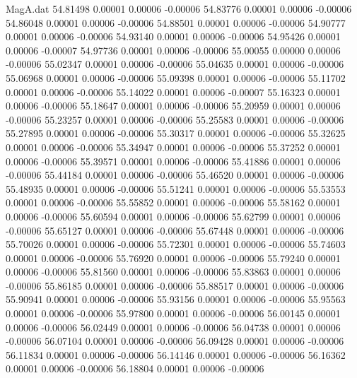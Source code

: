 \begin{filecontents}{MagA.dat}
  54.81498    0.00001    0.00006   -0.00006
  54.83776    0.00001    0.00006   -0.00006
  54.86048    0.00001    0.00006   -0.00006
  54.88501    0.00001    0.00006   -0.00006
  54.90777    0.00001    0.00006   -0.00006
  54.93140    0.00001    0.00006   -0.00006
  54.95426    0.00001    0.00006   -0.00007
  54.97736    0.00001    0.00006   -0.00006
  55.00055    0.00000    0.00006   -0.00006
  55.02347    0.00001    0.00006   -0.00006
  55.04635    0.00001    0.00006   -0.00006
  55.06968    0.00001    0.00006   -0.00006
  55.09398    0.00001    0.00006   -0.00006
  55.11702    0.00001    0.00006   -0.00006
  55.14022    0.00001    0.00006   -0.00007
  55.16323    0.00001    0.00006   -0.00006
  55.18647    0.00001    0.00006   -0.00006
  55.20959    0.00001    0.00006   -0.00006
  55.23257    0.00001    0.00006   -0.00006
  55.25583    0.00001    0.00006   -0.00006
  55.27895    0.00001    0.00006   -0.00006
  55.30317    0.00001    0.00006   -0.00006
  55.32625    0.00001    0.00006   -0.00006
  55.34947    0.00001    0.00006   -0.00006
  55.37252    0.00001    0.00006   -0.00006
  55.39571    0.00001    0.00006   -0.00006
  55.41886    0.00001    0.00006   -0.00006
  55.44184    0.00001    0.00006   -0.00006
  55.46520    0.00001    0.00006   -0.00006
  55.48935    0.00001    0.00006   -0.00006
  55.51241    0.00001    0.00006   -0.00006
  55.53553    0.00001    0.00006   -0.00006
  55.55852    0.00001    0.00006   -0.00006
  55.58162    0.00001    0.00006   -0.00006
  55.60594    0.00001    0.00006   -0.00006
  55.62799    0.00001    0.00006   -0.00006
  55.65127    0.00001    0.00006   -0.00006
  55.67448    0.00001    0.00006   -0.00006
  55.70026    0.00001    0.00006   -0.00006
  55.72301    0.00001    0.00006   -0.00006
  55.74603    0.00001    0.00006   -0.00006
  55.76920    0.00001    0.00006   -0.00006
  55.79240    0.00001    0.00006   -0.00006
  55.81560    0.00001    0.00006   -0.00006
  55.83863    0.00001    0.00006   -0.00006
  55.86185    0.00001    0.00006   -0.00006
  55.88517    0.00001    0.00006   -0.00006
  55.90941    0.00001    0.00006   -0.00006
  55.93156    0.00001    0.00006   -0.00006
  55.95563    0.00001    0.00006   -0.00006
  55.97800    0.00001    0.00006   -0.00006
  56.00145    0.00001    0.00006   -0.00006
  56.02449    0.00001    0.00006   -0.00006
  56.04738    0.00001    0.00006   -0.00006
  56.07104    0.00001    0.00006   -0.00006
  56.09428    0.00001    0.00006   -0.00006
  56.11834    0.00001    0.00006   -0.00006
  56.14146    0.00001    0.00006   -0.00006
  56.16362    0.00001    0.00006   -0.00006
  56.18804    0.00001    0.00006   -0.00006

\end{filecontents}
